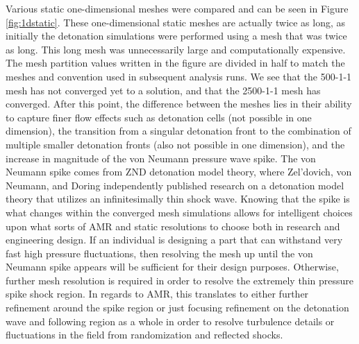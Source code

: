 Various static one-dimensional meshes were compared and can be seen in Figure \ref{fig:1dstatic}. These one-dimensional static meshes are actually twice as long, as initially the detonation simulations were performed using a mesh that was twice as long. This long mesh was unnecessarily large and computationally expensive. The mesh partition values written in the figure are divided in half to match the meshes and convention used in subsequent analysis runs. We see that the 500-1-1 mesh has not converged yet to a solution, and that the 2500-1-1 mesh has converged. After this point, the difference between the meshes lies in their ability to capture finer flow effects such as detonation cells (not possible in one dimension), the transition from a singular detonation front to the combination of multiple smaller detonation fronts (also not possible in one dimension), and the increase in magnitude of the von Neumann pressure wave spike. The von Neumann spike comes from ZND detonation model theory, where Zel'dovich\cite{zeldovich}, von Neumann\cite{neumann}, and Doring\cite{doring} independently published research on a detonation model theory that utilizes an infinitesimally thin shock wave. Knowing that the spike is what changes within the converged mesh simulations allows for intelligent choices upon what sorts of AMR and static resolutions to choose both in research and engineering design. If an individual is designing a part that can withstand very fast high pressure fluctuations, then resolving the mesh up until the von Neumann spike appears will be sufficient for their design purposes. Otherwise, further mesh resolution is required in order to resolve the extremely thin pressure spike shock region. In regards to AMR, this translates to either further refinement around the spike region or just focusing refinement on the detonation wave and following region as a whole in order to resolve turbulence details or fluctuations in the field from randomization and reflected shocks. 


